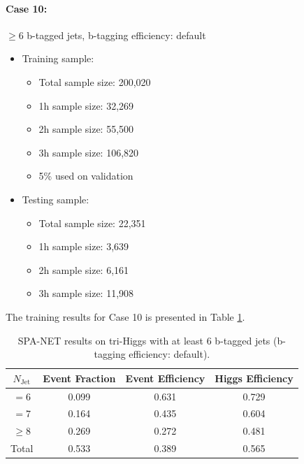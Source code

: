\documentclass[12pt]{article}
\begin{document}
		\paragraph{Case 10:} $\ge 6$ b-tagged jets, b-tagging efficiency: default
		\begin{itemize}
			\item Training sample:
			\begin{itemize}
				\item Total sample size: 200,020
				\item 1h sample size: 32,269
				\item 2h sample size: 55,500
				\item 3h sample size: 106,820
				\item 5\% used on validation
			\end{itemize}
			\item Testing sample: 
				\begin{itemize}
					\item Total sample size: 22,351
					\item 1h sample size: 3,639
					\item 2h sample size: 6,161
					\item 3h sample size: 11,908
				\end{itemize}
		\end{itemize}
		The training results for Case 10 is presented in Table \ref{tab:SPANet_triHiggs_6btag_default_10M}.
		\begin{table}[htpb]
			\centering
			\caption{SPA-NET results on tri-Higgs with at least 6 b-tagged jets (b-tagging efficiency: default).}
			\label{tab:SPANet_triHiggs_6btag_default_10M}
			\begin{tabular}{c|c|cc}
				$N_\text{Jet}$ & Event Fraction & Event Efficiency & Higgs Efficiency \\
				\hline
				$=6$	  &   0.099             &    0.631              &    0.729             \\
				$=7$	  &   0.164             &    0.435              &    0.604             \\
				$\ge 8$	  &   0.269             &    0.272              &    0.481             \\
				Total	  &   0.533             &    0.389              &    0.565             \\
			\end{tabular}
		\end{table}
\end{document}
